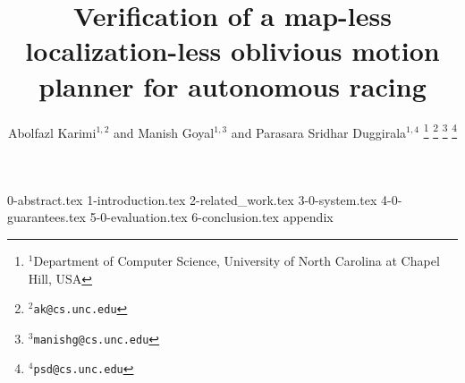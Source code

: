 \documentclass[letterpaper, 10 pt, conference]{ieeeconf}  %
\title{\LARGE \bf
Verification of a map-less localization-less oblivious motion planner for autonomous racing
}
\author{Abolfazl Karimi$^{1,2}$ and Manish Goyal$^{1, 3}$ and Parasara Sridhar Duggirala$^{1, 4}$%
\thanks{$^{1}$Department of Computer Science, University of North Carolina at Chapel Hill, USA}%
\thanks{$^{2}${\tt\small ak@cs.unc.edu}}%
\thanks{$^{3}${\tt\small manishg@cs.unc.edu}}%
\thanks{$^{4}${\tt\small psd@cs.unc.edu}}%
}
\begin{document}
\maketitle
\thispagestyle{empty}
\pagestyle{empty}

{0-abstract.tex}
{1-introduction.tex}
{2-related_work.tex}
{3-0-system.tex}
{4-0-guarantees.tex}
{5-0-evaluation.tex}
{6-conclusion.tex}
{appendix}



\end{document}
